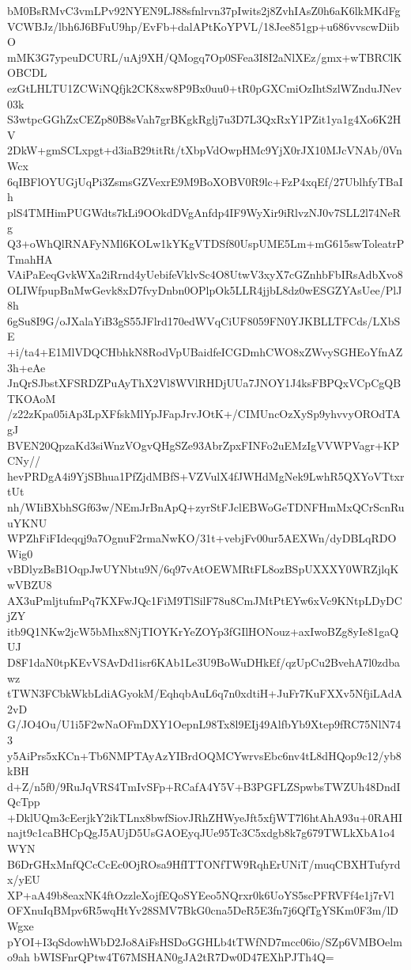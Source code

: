 bM0BsRMvC3vmLPv92NYEN9LJ88sfnlrvn37pIwits2j8ZvhIAsZ0h6aK6lkMKdFg
VCWBJz/lbh6J6BFuU9hp/EvFb+dalAPtKoYPVL/18Jee851gp+u686vvscwDiibO
mMK3G7ypeuDCURL/uAj9XH/QMogq7Op0SFea3I8I2aNlXEz/gmx+wTBRClKOBCDL
ezGtLHLTU1ZCWiNQfjk2CK8xw8P9Bx0uu0+tR0pGXCmiOzIhtSzlWZnduJNev03k
S3wtpcGGhZxCEZp80B8sVah7grBKgkRglj7u3D7L3QxRxY1PZit1ya1g4Xo6K2HV
2DkW+gmSCLxpgt+d3iaB29titRt/tXbpVdOwpHMc9YjX0rJX10MJcVNAb/0VnWcx
6qIBFlOYUGjUqPi3ZsmsGZVexrE9M9BoXOBV0R9lc+FzP4xqEf/27UblhfyTBaIh
plS4TMHimPUGWdts7kLi9OOkdDVgAnfdp4IF9WyXir9iRlvzNJ0v7SLL2l74NeRg
Q3+oWhQlRNAFyNMl6KOLw1kYKgVTDSf80UspUME5Lm+mG615swToleatrPTmahHA
VAiPaEeqGvkWXa2iRrnd4yUebifeVklvSc4O8UtwV3xyX7cGZnhbFbIRsAdbXvo8
OLIWfpupBnMwGevk8xD7fvyDnbn0OPlpOk5LLR4jjbL8dz0wESGZYAsUee/PlJ8h
6gSu8I9G/oJXalaYiB3gS55JFlrd170edWVqCiUF8059FN0YJKBLLTFCds/LXbSE
+i/ta4+E1MlVDQCHbhkN8RodVpUBaidfeICGDmhCWO8xZWvySGHEoYfnAZ3h+eAe
JnQrSJbstXFSRDZPuAyThX2Vl8WVlRHDjUUa7JNOY1J4ksFBPQxVCpCgQBTKOAoM
/z22zKpa05iAp3LpXFfskMlYpJFapJrvJOtK+/CIMUncOzXySp9yhvvyOROdTAgJ
BVEN20QpzaKd3siWnzVOgvQHgSZe93AbrZpxFINFo2uEMzIgVVWPVagr+KPCNy//
hevPRDgA4i9YjSBhua1PfZjdMBfS+VZVulX4fJWHdMgNek9LwhR5QXYoVTtxrtUt
nh/WIiBXbhSGf63w/NEmJrBnApQ+zyrStFJclEBWoGeTDNFHmMxQCrScnRuuYKNU
WPZhFiFIdeqqj9a7OgnuF2rmaNwKO/31t+vebjFv00ur5AEXWn/dyDBLqRDOWig0
vBDlyzBsB1OqpJwUYNbtu9N/6q97vAtOEWMRtFL8ozBSpUXXXY0WRZjlqKwVBZU8
AX3uPmljtufmPq7KXFwJQc1FiM9TlSilF78u8CmJMtPtEYw6xVc9KNtpLDyDCjZY
itb9Q1NKw2jcW5bMhx8NjTIOYKrYeZOYp3fGIlHONouz+axIwoBZg8yIe81gaQUJ
D8F1daN0tpKEvVSAvDd1isr6KAb1Le3U9BoWuDHkEf/qzUpCu2BvehA7l0zdbawz
tTWN3FCbkWkbLdiAGyokM/EqhqbAuL6q7n0xdtiH+JuFr7KuFXXv5NfjiLAdA2vD
G/JO4Ou/U1i5F2wNaOFmDXY1OepnL98Tx8l9EIj49AlfbYb9Xtep9fRC75NlN743
y5AiPrs5xKCn+Tb6NMPTAyAzYIBrdOQMCYwrvsEbc6nv4tL8dHQop9c12/yb8kBH
d+Z/n5f0/9RuJqVRS4TmIvSFp+RCafA4Y5V+B3PGFLZSpwbsTWZUh48DndIQcTpp
+DklUQm3cEerjkY2ikTLnx8bwfSiovJRhZHWyeJft5xfjWT7l6htAhA93u+0RAHI
najt9c1caBHCpQgJ5AUjD5UsGAOEyqJUe95Tc3C5xdgb8k7g679TWLkXbA1o4WYN
B6DrGHxMnfQCcCcEc0OjROsa9HfITTONfTW9RqhErUNiT/muqCBXHTufyrdx/yEU
XP+aA49b8eaxNK4ftOzzleXojfEQoSYEeo5NQrxr0k6UoYS5scPFRVFf4e1j7rVl
OFXnuIqBMpv6R5wqHtYv28SMV7BkG0cna5DeR5E3fn7j6QfTgYSKm0F3m/lDWgxe
pYOI+I3qSdowhWbD2Jo8AiFsHSDoGGHLb4tTWfND7mcc06io/SZp6VMBOelmo9ah
bWISFnrQPtw4T67MSHAN0gJA2tR7Dw0D47EXhPJTh4Q=
